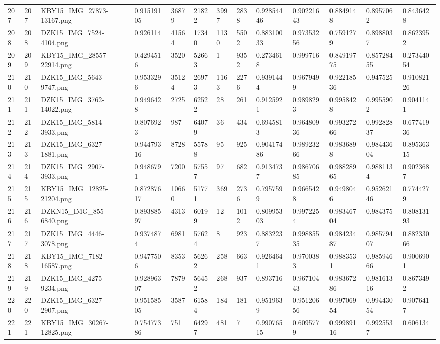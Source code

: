 \documentclass[11pt, a4paper, twoside]{report}
\begin{document}
\begin{longtable}[c]{@{}lllllllllllll@{}}
207 & 207 & KBY15\_IMG\_27873-13167.png & 0.91519105 & 36879 & 21822 & 3997 & 2838 & 0.92854446 & 0.90221643 & 0.8849148 & 0.8957062 & 0.8436428 \\
208 & 208 & DZK15\_IMG\_7524-4104.png & 0.926114 & 41564 & 17340 & 1130 & 5502 & 0.88310033 & 0.97353256 & 0.7591279 & 0.8988037 & 0.8623952 \\
209 & 209 & KBY15\_IMG\_28557-22914.png & 0.4294516 & 3520 & 52663 & 1 & 9352 & 0.2734618 & 0.999716 & 0.84919775 & 0.85728455 & 0.27344054 \\
210 & 210 & DZK15\_IMG\_5643-9747.png & 0.9533296 & 35124 & 26973 & 1163 & 2276 & 0.9391444 & 0.9679499 & 0.92218536 & 0.947525 & 0.91082126 \\
211 & 211 & DZK15\_IMG\_3762-14022.png & 0.9496428 & 2725 & 62522 & 28 & 261 & 0.9125921 & 0.9898293 & 0.9958428 & 0.9955902 & 0.9041141 \\
212 & 212 & DZK15\_IMG\_5814-3933.png & 0.8076923 & 987 & 64079 & 36 & 434 & 0.6945813 & 0.96480936 & 0.99327266 & 0.99282837 & 0.67741936 \\
213 & 213 & DZK15\_IMG\_6327-1881.png & 0.94479316 & 8728 & 55788 & 95 & 925 & 0.90417486 & 0.98923266 & 0.9836898 & 0.98443604 & 0.89536315 \\
214 & 214 & DZK15\_IMG\_2907-3933.png & 0.9486791 & 7200 & 57557 & 97 & 682 & 0.9134737 & 0.98670685 & 0.98828965 & 0.9881134 & 0.9023687 \\
215 & 215 & KBY15\_IMG\_12825-21204.png & 0.87287617 & 10660 & 51771 & 369 & 2736 & 0.7957599 & 0.9665428 & 0.9498046 & 0.95262146 & 0.7744279 \\
216 & 216 & DZKN15\_IMG\_855-6840.png & 0.89388597 & 4313 & 60199 & 12 & 1012 & 0.80995303 & 0.9972254 & 0.98346704 & 0.984375 & 0.80813193 \\
217 & 217 & DZK15\_IMG\_4446-3078.png & 0.9374874 & 6981 & 57624 & 8 & 923 & 0.8832237 & 0.99885535 & 0.98423487 & 0.98579407 & 0.88233066 \\
218 & 218 & KBY15\_IMG\_7182-16587.png & 0.9477506 & 8353 & 56262 & 258 & 663 & 0.9264641 & 0.9700383 & 0.9883531 & 0.98594666 & 0.9006901 \\
219 & 219 & DZK15\_IMG\_4275-9234.png & 0.92896307 & 7879 & 56452 & 268 & 937 & 0.893716 & 0.96710443 & 0.98367286 & 0.98161316 & 0.8673492 \\
220 & 220 & DZK15\_IMG\_6327-2907.png & 0.95158505 & 3587 & 61584 & 184 & 181 & 0.9519639 & 0.95120656 & 0.99706954 & 0.99443054 & 0.9076417 \\
221 & 221 & KBY15\_IMG\_30267-12825.png & 0.75477386 & 751 & 64297 & 481 & 7 & 0.99076515 & 0.6095779 & 0.99989116 & 0.9925537 & 0.606134 \\

\end{longtable}
\end{document}

